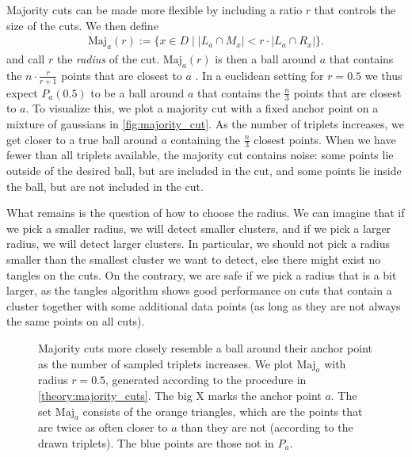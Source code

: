 Majority cuts can be made more flexible by including a ratio $r$ that controls the size of the cuts. 
We then define 
\begin{align*}
\text{Maj}_a(r) := \{x \in D \mid \left|   L_a \cap M_x\right| < r \cdot \left| L_a \cap R_x \right| \}
.\end{align*}
and call $r$ the \textit{radius} of the cut. 
$\text{Maj} _a(r)$ is then a ball around $a$ that contains the $n \cdot \frac{r}{r+1}$ points that are closest to $a$ . In a euclidean setting for 
$r = 0.5$ we thus expect $P_a(0.5)$ to be a ball around $a$ that contains the $\frac{n}{3}$ points that are closest to $a$. To visualize this, we plot a majority cut with a fixed anchor point on a 
mixture of gaussians in \autoref{fig:majority_cut}. 
As the number of triplets increases, we get closer to a true ball around $a$ containing the $\frac{n}{3}$ closest points. 
When we have fewer than all triplets available, the majority cut contains noise: 
some points lie outside of the desired ball, but are included in the cut, and some points
lie inside the ball, but are not included in the cut.

What remains is the question of how to choose the radius. We can imagine that if we pick a smaller radius, we will detect smaller clusters, and if we pick a larger radius, we will detect larger
clusters. 
In particular, we should not pick a radius smaller than the smallest cluster we want to detect, else there might exist no tangles on the cuts. 
On the contrary, we are safe if we pick a radius that is a bit larger, as the tangles algorithm shows good performance on cuts that contain a cluster together with some additional data points 
(as long as they are not always the same points on all cuts).

\onecolumn
\begin{figure}[ht]
    \centering
    \subfloat[500 triplets]{%
      \resizebox{0.5\textwidth}{!}{}
  }
    \subfloat[5000 triplets]{%
      \resizebox{0.5\textwidth}{!}{}}
    \hfill
    \subfloat[20000 triplets]{%
      \resizebox{0.5\textwidth}{!}{}}
    \caption{Majority cuts more closely resemble a ball around their anchor point as the number of 
        sampled triplets increases. 
        We plot $\text{Maj}_a$ with radius $r=0.5$, generated according to the procedure in \autoref{theory:majority_cuts}. The big X marks the anchor point $a$. 
        The set $\text{Maj}_a$ consists of the orange triangles, which are the points that are twice as often closer to $a$ than they are not (according to the drawn triplets). 
        The blue points are those not in $P_a$.}
    \label{fig:majority_cut}
\end{figure}
